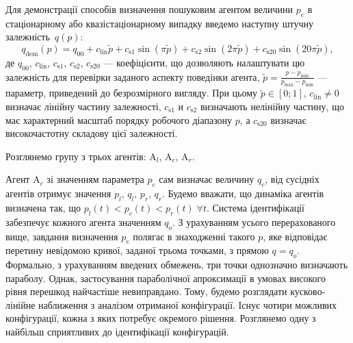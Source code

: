 \documentclass[a4paper,13pt]{atuaref}
\begin{document}
Для демонстрації способів визначення пошуковим агентом величини $ p_e $ в
стаціонарному або квазістаціонарному випадку введемо наступну штучну залежність~$q(p)$:
%
\begin{equation}
  q_\mathrm{dem}(p) = q_{00} + c_\mathrm{lin} \tilde{p} + c_\mathrm{s1} \sin( \pi \tilde{p} ) + c_\mathrm{s2} \sin( 2 \pi \tilde{p} ) + c_\mathrm{s20} \sin( 20 \pi \tilde{p} ),
  \label{atu:eq:q_dem}
\end{equation}
%
де $q_{00}$, $c_\mathrm{lin}$, $c_\mathrm{s1}$, $c_\mathrm{s2}$, $c_\mathrm{s20}$
---
коефіцієнти, що дозволяють налаштувати цю залежність для перевірки заданого аспекту поведінки агента,
$ \tilde{p} = \frac{p - p_{\min}}{p_{\max} - p_{\min}} $
---
параметр, приведений до безрозмірного вигляду.
При цьому $\tilde{p} \in[0;1]$, $c_\mathrm{lin} \ne 0$
визначає лінійну частину залежності,
$c_\mathrm{s1}$ и $c_\mathrm{s2}$
визначають нелінійну частину, що має характерний масштаб порядку робочого діапазону $p$,
а $c_\mathrm{s20}$ визначає високочастотну складову цієї залежності.

%
%


Розглянемо групу з трьох агентів:
$\mathrm{A}_l$,
$\mathrm{A}_c$,
$\mathrm{A}_r$.

Агент $ \mathrm {A} _c $ зі значенням параметра $ p_c $ сам визначає величину
$ q_c $, від сусідніх агентів отримує значення $ p_l $, $ q_l $, $ p_r $, $ q_r$.
Будемо вважати, що динаміка агентів визначена так, що $ p_l (t) <p_c (t)<p_r (t) \; \forall t $.
Система ідентифікації забезпечує кожного агента
значенням $ q_o $. З урахуванням усього перерахованого вище, завдання
визначення $ p_e $ полягає в знаходженні такого $ p $, яке відповідає перетину
невідомою кривої, заданої трьома точками, з прямою $ q = q_o $.
Формально, з урахуванням введених обмежень, три точки однозначно визначають параболу. Однак,
застосування параболічної апроксимації в умовах високого рівня перешкод
найчастіше невиправдано.
Тому, будемо розглядати кусково-лінійне наближення з
аналізом отриманої конфігурації. Існує чотири можливих конфігурації,
кожна з яких потребує окремого рішення. Розглянемо одну з найбільш
сприятливих до ідентифікації конфігурацій.
\end{document}
